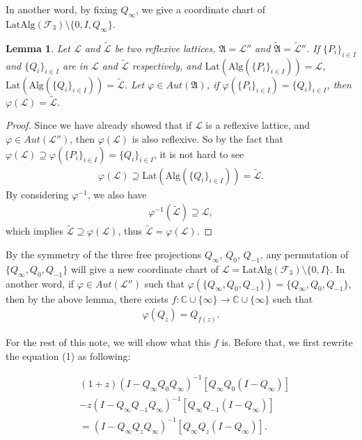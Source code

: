 \documentclass{amsart}
\newcommand{\AAA}{\mathfrak A}
\newcommand{\F}{\mathcal F}
\newcommand{\LLL}{\mathcal L} %
\newcommand{\Lat}{\mathrm{Lat}}
\newcommand{\Alg}{\mathrm{Alg}}
\newcommand{\C}{\mathbb C} %
\newtheorem{lemma}{Lemma}[section]
\begin{document}
In another word, by fixing $Q_{\infty}$, we give a coordinate chart of $\Lat\Alg(\F_3) \setminus
\{0, I, Q_{\infty} \}$.

\begin{lemma}
Let $\LLL$ and $\widetilde{\LLL}$ be two reflexive lattices, $\AAA = \LLL''$ and $\widetilde{\AAA} = \widetilde{\LLL}''$.  If $\{ P_{i} \}_{i \in I}$ and
$\{ Q_{i} \}_{i \in I}$ are in $\LLL$ and $\widetilde{\LLL}$ respectively,
and $\Lat(\Alg(\{ P_{i} \}_{i \in I})) = \LLL$, $\Lat(\Alg(\{ Q_{i} \}_{i \in I})) = \widetilde{\LLL}$. Let $\varphi \in Aut(\AAA)$, if $\varphi(\{ P_{i} \}_{i \in I})
= \{ Q_{i} \}_{i \in I}$, then $\varphi(\LLL) = \widetilde{\LLL}$.
\end{lemma}

\begin{proof}
Since we have already showed that if $\LLL$ is a reflexive lattice, and $\varphi \in Aut(\LLL'')$, then
$\varphi(\LLL)$ is also reflexive. So by the fact that $\varphi(\LLL) \supseteq \varphi(\{ P_{i} \}_{i \in I})
= \{ Q_{i} \}_{i \in I}$, it is not hard to see
\begin{align*}
\varphi(\LLL) \supseteq \Lat(\Alg(\{ Q_{i} \}_{i \in I})) = \widetilde{\LLL}.
\end{align*}
By considering $\varphi^{-1}$, we also have
\begin{align*}
\varphi^{-1}(\widetilde{\LLL}) \supseteq \LLL,
\end{align*}
which implies $\widetilde{\LLL} \supseteq \varphi(\LLL)$, thus $\widetilde{\LLL} = \varphi(\LLL)$.
\end{proof}

By the symmetry of the three free projections $Q_{\infty}$, $Q_{0}$, $Q_{-1}$,
any permutation of $\{Q_{\infty}, Q_{0}, Q_{-1} \}$ will give a new coordinate chart of $\LLL = \Lat\Alg(\F_3) \setminus
\{0, I \}$. In another word, if $\varphi \in Aut(\LLL'')$ such that $\varphi(\{Q_{\infty}, Q_{0}, Q_{-1} \})
= \{Q_{\infty}, Q_{0}, Q_{-1} \}$, then by the above lemma, there exists $f: \C \cup \{\infty \} \rightarrow \C \cup \{\infty \}$
such that
\begin{align*}
\varphi(Q_{z}) = Q_{f(z)}.
\end{align*}

For the rest of this note, we will show what this $f$ is. Before that, we first rewrite the equation (1) as following:

\begin{equation}\label{(*)}
\begin{split}
&(1+z)(I - Q_{\infty}Q_{0}Q_{\infty})^{-1}[Q_{\infty}Q_{0}(I-Q_{\infty})] \\
& - z(I - Q_{\infty}Q_{-1}Q_{\infty})^{-1}[Q_{\infty}Q_{-1}(I-Q_{\infty})] \\
&= (I - Q_{\infty}Q_{z}Q_{\infty})^{-1}[Q_{\infty}Q_{z}(I-Q_{\infty})].
\end{split}
\end{equation}
\end{document}
